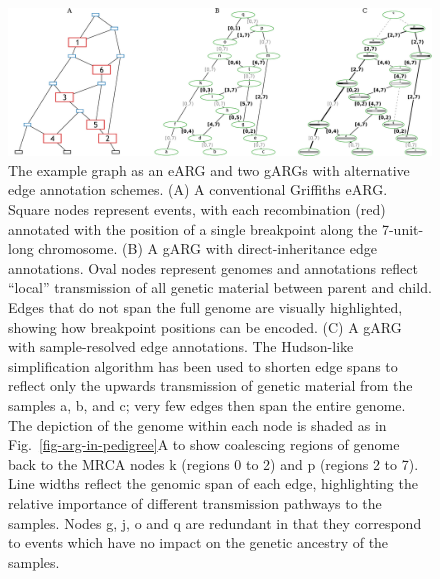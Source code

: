 \documentclass{article}
\begin{document}
\begin{figure}
\centering
\includegraphics[width=\textwidth]{illustrations/ancestry-resolution}
\caption{\label{fig-ancestry-resolution}
The \citet[][Fig.~1]{wiuf1999recombination} example graph as an eARG and
two gARGs with alternative edge annotation schemes.
(A) A conventional Griffiths eARG. Square nodes represent events, with
each recombination (red) annotated with the position of a single breakpoint
along the 7-unit-long chromosome.
(B) A gARG with direct-inheritance edge annotations. Oval nodes represent
genomes and annotations reflect ``local'' transmission of all genetic material
between parent and child. Edges that do not span the full genome are visually
highlighted, showing how breakpoint positions can be encoded.
(C) A gARG with sample-resolved edge annotations. The Hudson-like simplification
algorithm has been used to shorten edge spans to
reflect only the upwards transmission of genetic material from the samples
\textsf{a}, \textsf{b}, and \textsf{c}; very few edges then span the entire genome.
The depiction of the genome within each
node is shaded as in Fig.~\ref{fig-arg-in-pedigree}A to show coalescing
regions of genome back to the MRCA nodes \textsf{k} (regions 0 to 2) and \textsf{p}
(regions 2 to 7). Line widths reflect the genomic span of each edge, highlighting
the relative importance of different transmission pathways to the samples. Nodes
\textsf{g},  \textsf{j}, \textsf{o} and \textsf{q} are redundant in that they correspond
to events which have no impact on the genetic ancestry of the samples.
}
\end{figure}

\end{document}
